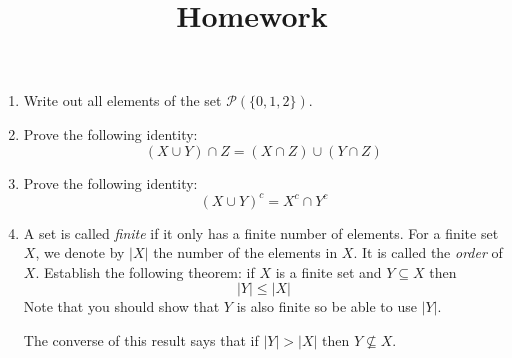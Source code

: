 \documentclass[12pt]{amsart}
\theoremstyle{definition}
\begin{document}
\title{Homework}

\maketitle

\begin{enumerate}
	\item Write out all elements of the set $\mathcal P(\{0,1,2\})$. 
		
	\item Prove the following identity: 
	\begin{displaymath}
		(X \cup Y) \cap Z = (X \cap Z) \cup (Y \cap Z)
	\end{displaymath}

	\item Prove the following identity:
	\begin{displaymath}
		(X \cup Y)^c = X^c \cap Y^c
	\end{displaymath}

	\item A set is called \textit{finite} if it only has a finite number of elements. 
		For a finite set $X$, we denote by $|X|$ the number of the elements 
		in $X$. It is called the \textit{order} of $X$. Establish the following 
		theorem: if $X$ is a finite set and $Y \subseteq X$ then 
		\begin{displaymath}
			|Y| \leq |X| 
		\end{displaymath}
		Note that you should show that $Y$ is also finite so be able to 
		use $|Y|$. 

		The converse of this result says that if $|Y| > |X|$ then $Y \nsubseteq X$. 


\end{enumerate}
\end{document}
